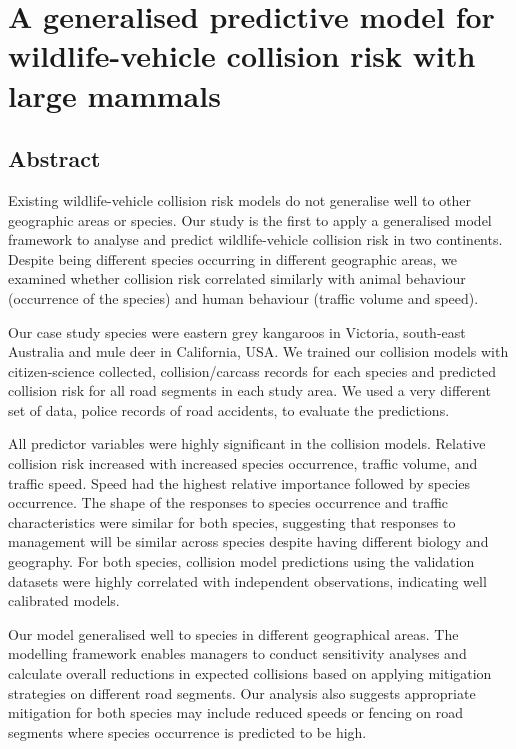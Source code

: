 \chapter{A generalised predictive model for wildlife-vehicle collision risk with large mammals}\label{sec:cal}
\newpage

\begin{localsize}{11}
\section*{\centering Abstract}

Existing wildlife-vehicle collision risk models do not generalise well to other geographic areas or species. Our study is the first to apply a generalised model framework to analyse and predict wildlife-vehicle collision risk in two continents. Despite being different species occurring in different geographic areas, we examined whether collision risk correlated similarly with animal behaviour (occurrence of the species) and human behaviour (traffic volume and speed).

Our case study species were eastern grey kangaroos in Victoria, south-east Australia and mule deer in California, USA. We trained our collision models with citizen-science collected, collision/carcass records for each species and predicted collision risk for all road segments in each study area.  We used a very different set of data, police records of road accidents, to evaluate the predictions.

All predictor variables were highly significant in the collision models.  Relative collision risk increased with increased species occurrence, traffic volume, and traffic speed. Speed had the highest relative importance followed by species occurrence.  The shape of the responses to species occurrence and traffic characteristics were similar for both species, suggesting that responses to management will be similar across species despite having different biology and geography. For both species, collision model predictions using the validation datasets were highly correlated with independent observations, indicating well calibrated models.

Our model generalised well to species in different geographical areas. The modelling framework enables managers to conduct sensitivity analyses and calculate overall reductions in expected collisions based on applying mitigation strategies on different road segments. Our analysis also suggests appropriate mitigation for both species may include reduced speeds or fencing on road segments where species occurrence is predicted to be high.

\end{localsize}

